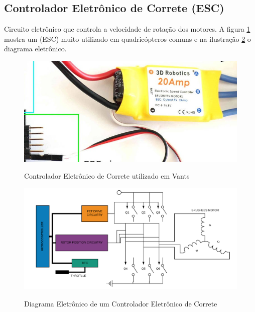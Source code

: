 \subsection{Controlador Eletrônico de Correte (ESC)}
Circuito eletrônico que controla a velocidade de rotação dos motores. A figura \ref{fig:esc} mostra um (ESC) muito utilizado em quadricópteros comuns e na ilustração \ref{fig:motordrive} o diagrama eletrônico.
\begin{figure}[H]
  \centering
  \caption{Controlador Eletrônico de Correte utilizado em Vants}
  \includegraphics[scale=.3]{figs/esc.jpg}
  \label{fig:esc}
\end{figure}

\begin{figure}[H]
  \centering
  \caption{Diagrama Eletrônico de um Controlador Eletrônico de Correte}
  \includegraphics[scale=.2]{figs/drivemotorpng.png}
  \label{fig:motordrive}
\end{figure}

